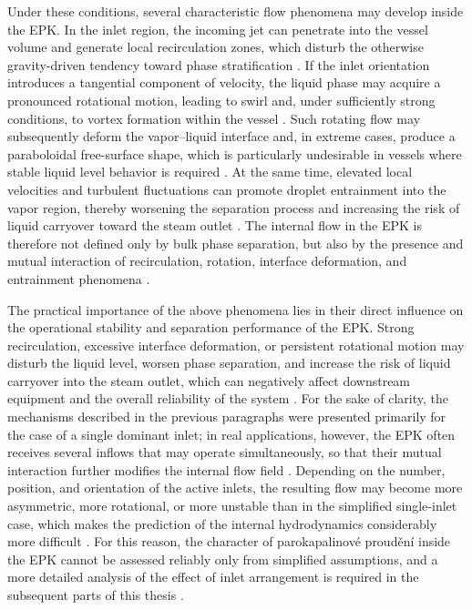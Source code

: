 Under these conditions, several characteristic flow phenomena may develop inside the EPK. In the inlet region, the incoming jet can penetrate into the vessel volume and generate local recirculation zones, which disturb the otherwise gravity-driven tendency toward phase stratification \cite{LeeEtAl2019,IshiiHibiki2011}. If the inlet orientation introduces a tangential component of velocity, the liquid phase may acquire a pronounced rotational motion, leading to swirl and, under sufficiently strong conditions, to vortex formation within the vessel \cite{CarusoEtAl2016,CristofanoEtAl2014}. Such rotating flow may subsequently deform the vapor--liquid interface and, in extreme cases, produce a paraboloidal free-surface shape, which is particularly undesirable in vessels where stable liquid level behavior is required \cite{CarusoEtAl2016,CristofanoEtAl2014}. At the same time, elevated local velocities and turbulent fluctuations can promote droplet entrainment into the vapor region, thereby worsening the separation process and increasing the risk of liquid carryover toward the steam outlet \cite{IshiiHibiki2011,LeeEtAl2019}. The internal flow in the EPK is therefore not defined only by bulk phase separation, but also by the presence and mutual interaction of recirculation, rotation, interface deformation, and entrainment phenomena \cite{IshiiHibiki2011}.

The practical importance of the above phenomena lies in their direct influence on the operational stability and separation performance of the EPK. Strong recirculation, excessive interface deformation, or persistent rotational motion may disturb the liquid level, worsen phase separation, and increase the risk of liquid carryover into the steam outlet, which can negatively affect downstream equipment and the overall reliability of the system \cite{IshiiHibiki2011,LeeEtAl2019}. For the sake of clarity, the mechanisms described in the previous paragraphs were presented primarily for the case of a single dominant inlet; in real applications, however, the EPK often receives several inflows that may operate simultaneously, so that their mutual interaction further modifies the internal flow field \cite{CarusoEtAl2016,SafikhaniEtAl2018}. Depending on the number, position, and orientation of the active inlets, the resulting flow may become more asymmetric, more rotational, or more unstable than in the simplified single-inlet case, which makes the prediction of the internal hydrodynamics considerably more difficult \cite{CarusoEtAl2016,SafikhaniEtAl2018}. For this reason, the character of parokapalinové proudění inside the EPK cannot be assessed reliably only from simplified assumptions, and a more detailed analysis of the effect of inlet arrangement is required in the subsequent parts of this thesis \cite{IshiiHibiki2011,LeeEtAl2019}.

